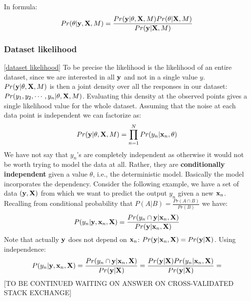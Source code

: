 In formula:
\begin{equation}
\label{ClassBayes}
Pr(\theta|\mathbf{y},\mathrm{\mathbf{X}},M) = \frac{Pr(\mathbf{y}|\theta,\mathrm{\mathbf{X}},M)Pr(\theta|\mathrm{\mathbf{X}}, M)}{Pr(\mathbf{y}|\mathrm{\mathbf{X}},M)}
\end{equation}

\subsubsection{Dataset likelihood}
\label{dataset likelihood}
\autoref{dataset likelihood}
To be precise the likelihood is the likelihood of an entire dataset, since we are interested in all $\mathbf{y}$ and not in a single value $y$. $Pr(\mathbf{y}|\theta,\mathrm{\mathbf{X}},M)$ is then a joint density over all the responses in our dataset: $Pr(y_1, y_2, \cdots, y_n|\theta,\mathrm{\mathbf{X}},M)$. Evaluating this density at the observed points gives a single likelihood value for the whole dataset.	 Assuming that the noise at each data point is independent we can factorize as:
\begin{equation}
Pr(\mathbf{y}|\theta,\mathrm{\mathbf{X}},M) = \prod_{n=1}^N Pr(y_n|\mathbf{x}_n, \theta)
\end{equation}
We have not say that $y_n$'s are completely independent as otherwise it would not be worth trying to model the data at all. Rather, they are \textbf{conditionally independent} given a value $\theta$, i.e., the deterministic model.
Basically the model incorporates the dependency. Consider the following example, we have a set of data $(\mathbf{y},\mathrm{\mathbf{X}})$ from which we want to predict the output $y_n$ given a new $\mathbf{x}_n$. Recalling from conditional probability that $P(A|B) = \frac{Pr(A\cap B)}{Pr(B)}$ we have:
\begin{equation}
P(y_n|\mathbf{y},\mathbf{x}_n, \mathrm{\mathbf{X}}) = \frac{Pr(y_n\cap \mathbf{y}|\mathbf{x}_n,\mathrm{\mathbf{X}})}{Pr(\mathbf{y}|\mathbf{x}_n,\mathrm{\mathbf{X}})}
\end{equation}
Note that actually $\mathbf{y}$ does not depend on $\mathbf{x}_n$: $Pr(\mathbf{y}|\mathbf{x}_n,\mathrm{\mathbf{X}}) = Pr(\mathbf{y}|\mathrm{\mathbf{X}})$. Using independence:
\begin{equation}
P(y_n|\mathbf{y},\mathbf{x}_n, \mathrm{\mathbf{X}}) = \frac{Pr(y_n\cap \mathbf{y}|\mathbf{x}_n,\mathrm{\mathbf{X}})}{Pr(\mathbf{y}|\mathrm{\mathbf{X}})} = \frac{Pr(\mathbf{y}|\mathrm{\mathbf{X}}) Pr(y_n|\mathbf{x}_n,\mathrm{\mathbf{X}})}{Pr(\mathbf{y}|\mathrm{\mathbf{X}})} = 
\end{equation}
[TO BE CONTINUED WAITING ON ANSWER ON CROSS-VALIDATED STACK EXCHANGE]
